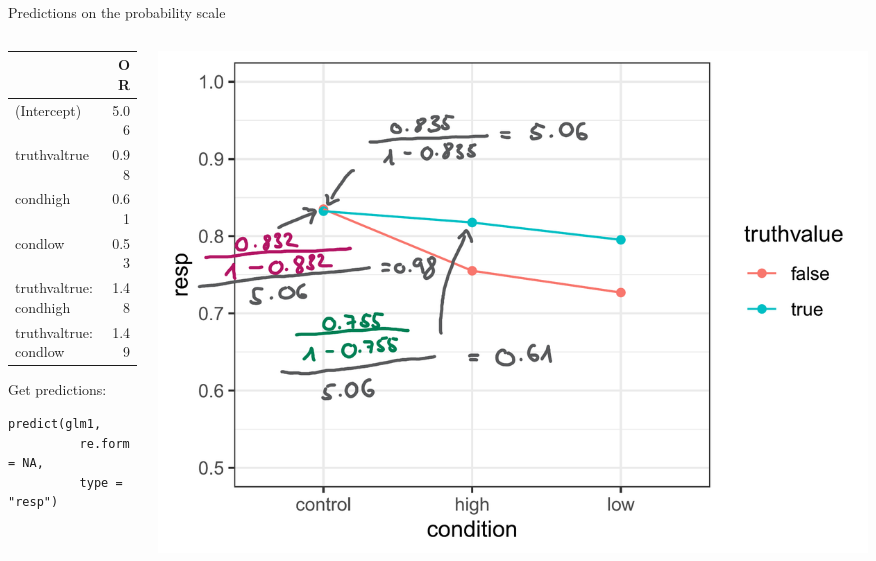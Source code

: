 \documentclass[aspectratio=169]{beamer}
\begin{document}
\begin{frame}[fragile]{Predictions on the probability scale}
  \begin{columns}
    \begin{column}[c]{.3\textwidth}
      {\small
      \begin{tabular}{@{}lr@{}}
      \hline
 & OR \\ 
  \hline
  (Intercept) & 5.06 \\ 
  truthvaltrue & 0.98 \\ 
  condhigh & 0.61 \\ 
  condlow & 0.53 \\ 
  truthvaltrue:condhigh & 1.48 \\ 
  truthvaltrue:condlow & 1.49 \\ 
   \hline
\end{tabular}
      }

\vspace{.3cm}
Get predictions:
\begin{lstlisting}[style = plain]
  predict(glm1, 
          re.form = NA,
          type = "resp")
\end{lstlisting}
    \end{column}
    \begin{column}[c]{.7\textwidth}
      \includegraphics[scale = .35]{../figures/predprob_with_params}
    \end{column}
  \end{columns}
\end{frame}
\end{document}
